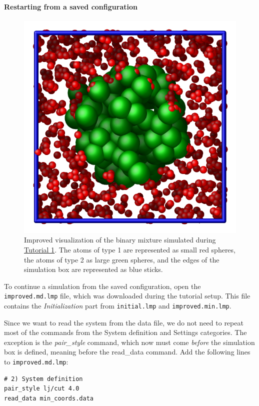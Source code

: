 \documentclass[9pt,tutorial]{livecoms}
\newcommand{\lmpcmd}[1]{\hspace{0pt}\colorbox{listing}{\textcolor{command}{\small{#1}}}\hspace{0pt}} %
\newcommand{\flecmd}[1]{\textcolor{command}{\texttt{#1}}} %
\begin{document}
\paragraph{Restarting from a saved configuration}

\begin{figure}
\centering
\includegraphics[width=0.55\linewidth]{LJ-cylinder}
\caption{Improved visualization of the binary mixture simulated
during \hyperref[lennard-jones-label]{Tutorial 1}.  The atoms of type 1 are
represented as small red spheres, the atoms of type 2 as large green spheres,
and the edges of the simulation box are represented as blue sticks.}
\label{fig:improved-min}
\end{figure}

To continue a simulation from the saved configuration, open the
\flecmd{improved.md.lmp} file, which was downloaded during the tutorial setup.
This file contains the \textit{Initialization} part from \flecmd{initial.lmp}
and \flecmd{improved.min.lmp}.

Since we want to read the system from the data file, we do not need
to repeat most of the commands from the \lmpcmd{System definition}
and \lmpcmd{Settings} categories.  The exception is the \textit{pair\_style}
command, which now must come \emph{before} the simulation box is defined,
meaning before the \lmpcmd{read\_data} command.  Add the following
lines to \flecmd{improved.md.lmp}:
\begin{lstlisting}
# 2) System definition
pair_style lj/cut 4.0
read_data min_coords.data
\end{lstlisting}
\end{document}
